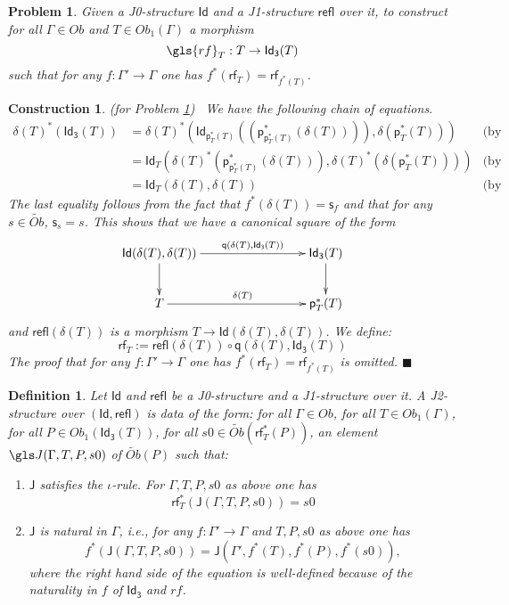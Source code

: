 \documentclass[12pt]{article}
\numberwithin{equation}{section}
\newenvironment{eq}{\begin{equation}}{\end{equation}}
\newtheorem{definition}[proposition]{Definition}
\newtheorem{problem}[proposition]{Problem}
\newtheorem{construction0}[proposition]{Construction}
\newenvironment{construction}[1]{\begin{construction0}(for Problem \ref{#1})\ }{$\blacksquare$ \end{construction0}}
\newcommand{\by}[1]{\text{(by #1)}}
\newcommand{\llabel}[1]{\label{#1}}
\newcommand{\sr}{\rightarrow}
\newcommand{\wt}{\widetilde}
\newcommand{\p}{\mathsf{p}}
\newcommand{\q}{\mathsf{q}}
\newcommand{\s}{\mathsf{s}}     %
\newcommand{\Id}{\mathsf{Id}} %
\newcommand{\Idx}{\mathsf{Id_3}} %
\newcommand{\refl}{\mathsf{refl}}
\newcommand{\J}{\mathsf{J}}
\newcommand{\rf}{\mathsf{rf}}
\newcommand{\Obwt}{\wt{Ob}}
\begin{document}
\begin{problem}
\llabel{2015.03.27.prob2} Given a J0-structure $\Id$ and a J1-structure $\refl$
over it, to construct for all $\Gamma\in Ob$ and $T\in Ob_1(\Gamma)$ a morphism
%
$$\gls{rf}_T:T\sr \Idx(T)$$
%
such that for any $f:\Gamma'\sr \Gamma$ one has $f^*(\rf_T)=\rf_{f^*(T)}$.
\end{problem}
%
\begin{construction}{2015.03.27.prob2}
\llabel{2015.03.27.constr2}\rm We have the following chain of equations.
%
\begin{align*}
  \delta(T)^*(\Idx(T)) & = \delta(T)^*(\Id_{\p_T^*(T)}((\p_{\p_T^*(T)}^*(\delta(T)))),\delta(\p_T^*(T)))  & \by{...}\\
    & = \Id_T(\delta(T)^*(\p_{\p_T^*(T)}^*(\delta(T))),\delta(T)^*(\delta(\p_T^*(T)))) & \by{...}\\
    & = \Id_T(\delta(T),\delta(T)) & \by{...}
\end{align*}
%
The last equality follows from the fact that $f^*(\delta(T))=\s_f$ and that for
any $s\in\Obwt$, $\s_s=s$.  This shows that we have a canonical square of the
form
%
\begin{eq}
\llabel{2015.03.31.eq3}
\begin{xy}
          \xymatrix@C=7pc{ \Id(\delta(T),\delta(T))
            \ar[r]^-{\q(\delta(T),\Idx(T))} \ar[d] & \Idx(T) \ar[d]\\ T
            \ar[r]^{\delta(T)} & \p_T^*(T) }
       \end{xy}
\end{eq}%
%
and $\refl(\delta(T))$ is a morphism $T\sr \Id(\delta(T),\delta(T))$. We define:
%
\begin{eq}
\llabel{2015.04.02.eq1} \rf_T:=\refl(\delta(T))\circ \q(\delta(T),\Idx(T))
\end{eq}%
%
The proof that for any $f:\Gamma'\sr \Gamma$ one has $f^*(\rf_T)=\rf_{f^*(T)}$ is
omitted.
\end{construction}
%
\begin{definition}
\llabel{2015.03.27.def3} Let $\Id$ and $\refl$ be a J0-structure and a
J1-structure over it. A J2-structure over $(\Id,\refl)$ is data of the form: for
all $\Gamma\in Ob$, for all $T\in Ob_1(\Gamma)$, for all $P\in Ob_1(\Idx(T))$,
for all $s0\in \Obwt(\rf_T^*(P))$, an element $\gls J(\Gamma,T,P,s0)$ of
$\Obwt(P)$ such that:
%
\begin{enumerate}
\item $\J$ satisfies the $\iota$-rule. For $\Gamma, T, P, s0$ as above one has
%
$$\rf_T^*(\J(\Gamma,T,P,s0))=s0$$
%
\item $\J$ is natural in $\Gamma$, i.e., for any $f:\Gamma'\sr \Gamma$ and
  $T,P,s0$ as above one has
%
$$f^*(\J(\Gamma,T,P,s0))=\J(\Gamma',f^*(T),f^*(P),f^*(s0)),$$
%
where the right hand side of the equation is well-defined because of the
naturality in $f$ of $\Idx$ and $rf$.
\end{enumerate}
\end{definition}
\end{document}
